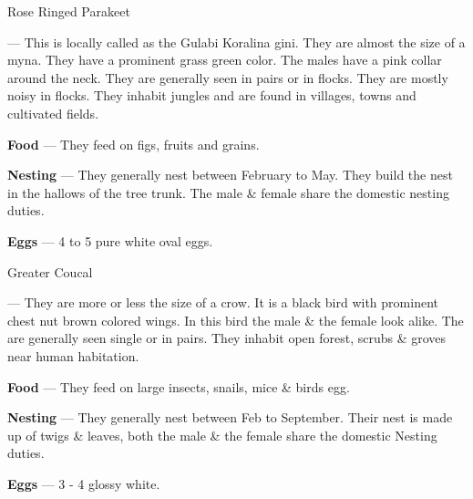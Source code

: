 \begin{bird}{Rose Ringed Parakeet}

 --- This is locally called as the Gulabi Koralina gini. They are almost the size of a myna. They have a prominent grass green color. The males have a pink collar around the neck. They are generally seen in pairs or in flocks. They are mostly noisy in flocks. They inhabit 
jungles and are found in villages, towns and cultivated fields.

{\large\bf Food} --- They feed on figs, fruits and grains. 

{\large\bf Nesting} --- They generally nest between February to May. They build the nest in the hallows of the tree trunk. The male \& female share the domestic nesting duties.

{\large\bf Eggs} --- 4 to 5 pure white oval eggs.
\end{bird}

\begin{bird}{Greater Coucal}

 --- They are more or less the size of a crow. It is a black bird with prominent chest nut brown colored wings. In this bird the male \& the female look alike. The are generally seen single or in pairs. They inhabit open forest, scrubs \& groves near human habitation. 

{\large\bf Food} --- They feed on large insects, snails, mice \& birds egg.

{\large\bf Nesting} --- They generally nest between Feb to September. Their nest is made up of twigs \& leaves, both the male \& the female share the domestic Nesting duties.

{\large\bf Eggs} --- 3 - 4 glossy white.
\end{bird}


